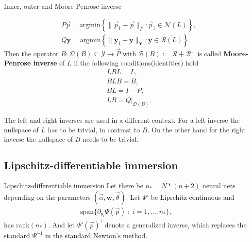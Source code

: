 \begin{mydef}{Inner, outer and Moore Penrose inverse}
\begin{enumerate}
            \begin{align}
                &P\vec{p} = \text{argmin}
                \left\{
                    \|\vec{p}_1-\vec{p}\|_{\vec{P}} : \vec{p}_1 \in
                \mathcal{N}(L) \right\},\\
                &Q\mathbf{y} = \text{argmin}
                \left\{
                    \|\mathbf{y}_1 - \mathbf{y}\|_\mathbf{Y}: \mathbf{y} \in
                    \overline{\mathcal{R}(L)} \right\}
            \end{align}
            Then the operator $B: \mathcal{D}(B) \subseteq \mathcal{Y} \to
            \vec{P}$ with $\mathcal{B}(B):= \mathcal{R} \dotplus
            \mathcal{R}^{\perp}$ is called \textbf{Moore-Penrose inverse} of
            $L$ if the following conditions(identities) hold
            \begin{align}
                &LBL = L, \nonumber\\
                &BLB = B, \nonumber\\
                &BL= I-P, \\
                &LB = Q|_{\mathcal{D}(B)} \nonumber.
            \end{align}

    \end{enumerate}
    The left and right inverses are used in a different context. For a left
    inverse the nullspace of $L$ has to be trivial, in contrast to $B$.
    On the other hand for the right inverse the nullspace of $B$ needs to be
    trivial.


\end{mydef}

\subsection{Lipschitz-differentiable immersion}
\begin{mydef}{Lipschitz-differentiable immersion}
    Let there be $n_* = N*(n+2)$ neural nets depending on the parameters
    $(\vec{\alpha}, \mathbf{w}, \vec{\theta})$. Let $\Psi'$ be
    Lipschitz-continuous and
    \begin{align}
        \text{span}\{\partial_{p_i}\Psi(\vec{p})\;:\;i=1,\ldots,n_*\},
    \end{align}
    has $\text{rank}(n_*)$.
    And let $\Psi'(\vec{p})^{\dagger}$ denote a generalized inverse,
    which replaces the standard $\Psi^{-1}$ in the standard Newton's method.
\end{mydef}

